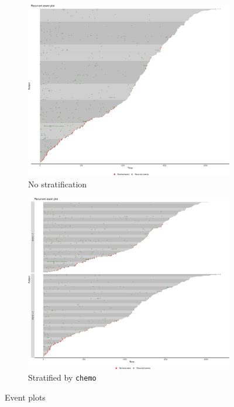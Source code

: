 \vspace*{-.3cm}\begin{figure}[H]
\centering
\begin{subfigure}[t]{1.8in}
\centering
\includegraphics[scale = .125]{images/ep-1}
\caption{No stratification}\label{fig:1a}
\end{subfigure}
\quad
\begin{subfigure}[t]{1.8in}
\centering
\includegraphics[scale = .125]{images/ep-2}
\caption{Stratified by \texttt{chemo}}\label{fig:1b}
\end{subfigure}
\caption{Event plots}\label{fig:1}
\end{figure}

